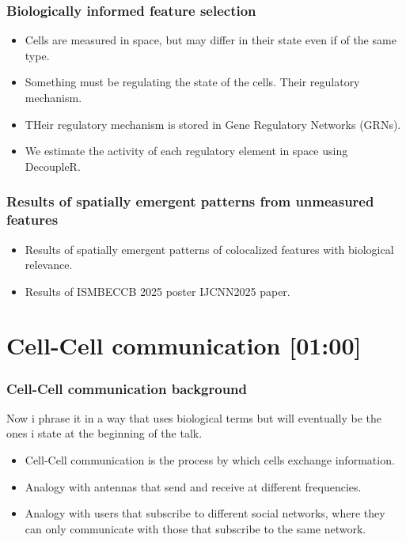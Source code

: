 \begin{frame}
    \frametitle{Biologically informed feature selection}
    \begin{block}{}
        \begin{itemize}
            \item Cells are measured in space, but may differ in their state even if of the same type.
            \item Something must be regulating the state of the cells. Their regulatory mechanism.
            \item THeir regulatory mechanism is stored in Gene Regulatory Networks (GRNs).
            \item We estimate the activity of each regulatory element in space using DecoupleR.
        \end{itemize}
    \end{block}
\end{frame}

\begin{frame}
    \frametitle{Results of spatially emergent patterns from unmeasured features}
    \begin{block}{}
        \begin{itemize}
            \item Results of spatially emergent patterns of colocalized features with biological relevance.
            \item Results of ISMB\/ECCB 2025 poster \/ IJCNN2025 paper.
        \end{itemize}
    \end{block}
\end{frame}

\section{Cell-Cell communication {[01:00]}}

\begin{frame}
    \frametitle{Cell-Cell communication background}
    Now i phrase it in a way that uses biological terms but will eventually be the ones i state at the beginning of the talk.
    \begin{block}{}
        \begin{itemize}
            \item Cell-Cell communication is the process by which cells exchange information.
            \item Analogy with antennas that send and receive at different frequencies.
            \item Analogy with users that subscribe to different social networks, where they can only communicate with those that subscribe to the same network.
        \end{itemize}
    \end{block}
\end{frame}

